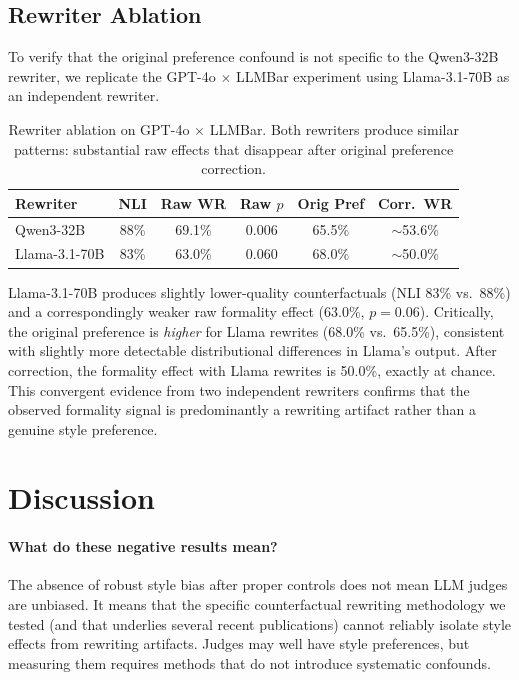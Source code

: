 \documentclass[11pt,a4paper]{article}
\begin{document}
\subsection{Rewriter Ablation}
\label{sec:rewriter}

To verify that the original preference confound is not specific to the Qwen3-32B rewriter, we replicate the GPT-4o $\times$ LLMBar experiment using Llama-3.1-70B as an independent rewriter.

\begin{table}[t]
\centering
\caption{Rewriter ablation on GPT-4o $\times$ LLMBar. Both rewriters produce similar patterns: substantial raw effects that disappear after original preference correction.}
\label{tab:rewriter}
\small
\begin{tabular}{lccccc}
\toprule
\textbf{Rewriter} & \textbf{NLI} & \textbf{Raw WR} & \textbf{Raw $p$} & \textbf{Orig Pref} & \textbf{Corr.\ WR} \\
\midrule
Qwen3-32B & 88\% & 69.1\% & 0.006 & 65.5\% & $\sim$53.6\% \\
Llama-3.1-70B & 83\% & 63.0\% & 0.060 & 68.0\% & $\sim$50.0\% \\
\bottomrule
\end{tabular}
\end{table}

Llama-3.1-70B produces slightly lower-quality counterfactuals (NLI 83\% vs.\ 88\%) and a correspondingly weaker raw formality effect (63.0\%, $p=0.06$).
Critically, the original preference is \emph{higher} for Llama rewrites (68.0\% vs.\ 65.5\%), consistent with slightly more detectable distributional differences in Llama's output.
After correction, the formality effect with Llama rewrites is 50.0\%, exactly at chance.
This convergent evidence from two independent rewriters confirms that the observed formality signal is predominantly a rewriting artifact rather than a genuine style preference.

\section{Discussion}

\paragraph{What do these negative results mean?}
The absence of robust style bias after proper controls does not mean LLM judges are unbiased.
It means that the specific counterfactual rewriting methodology we tested (and that underlies several recent publications) cannot reliably isolate style effects from rewriting artifacts.
Judges may well have style preferences, but measuring them requires methods that do not introduce systematic confounds.
\end{document}
